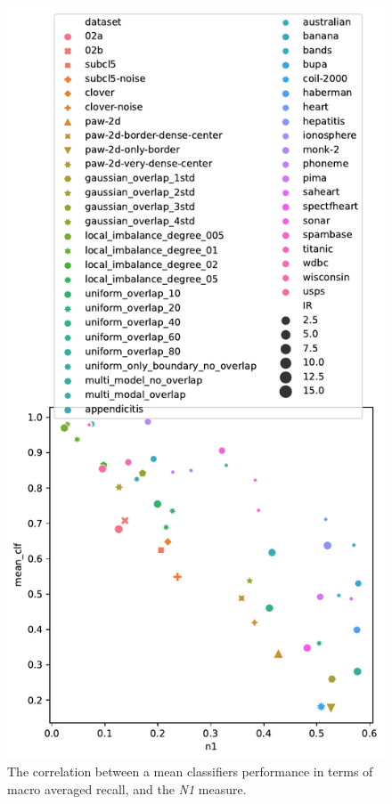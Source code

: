 \begin{figure}[tb]
\centering
\includegraphics[width=0.8\columnwidth]{../plots/dataset_plots/siam_full_plot_n1.pdf}
\caption{The correlation between a mean classifiers performance in terms of macro averaged recall, and the \emph{N1} measure.}
\label{fig:n1_dataset_plot}
\end{figure}
